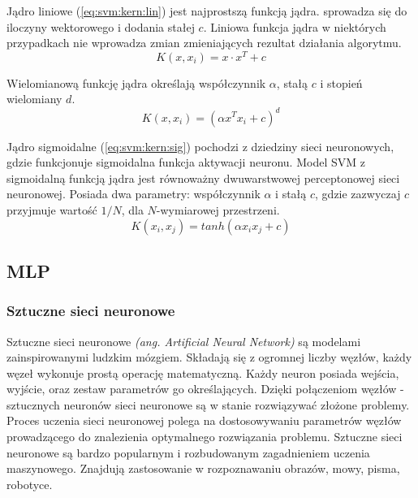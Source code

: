 \documentclass[a4paper,12pt,twoside,openany]{report}
\newcommand{\ang}[1]{\textit{(ang. #1)}}
\newcommand{\Eq}[1]{(\ref{#1})}
\begin{document}
Jądro liniowe \Eq{eq:svm:kern:lin} jest najprostszą funkcją jądra. 
sprowadza się do iloczyny wektorowego i dodania stałej $c$.
Liniowa funkcja jądra w niektórych przypadkach nie wprowadza zmian zmieniających rezultat działania algorytmu.
\begin{equation}
	\label{eq:svm:kern:lin}
	K(x, x_i) = x \cdot x ^ T + c
\end{equation}

Wielomianową funkcję jądra określają współczynnik $\alpha$, stałą $c$ i stopień wielomiany $d$.
\begin{equation}
	\label{eq:svm:kern:poly}
	K(x, x_i) = (\alpha x^T x_i + c)^d 
\end{equation}

Jądro sigmoidalne \Eq{eq:svm:kern:sig} pochodzi z dziedziny sieci neuronowych,
gdzie funkcjonuje sigmoidalna funkcja aktywacji neuronu. 
Model SVM z sigmoidalną funkcją jądra jest równoważny dwuwarstwowej perceptonowej sieci neuronowej.
Posiada dwa parametry: współczynnik $\alpha$ i stałą $c$, gdzie zazwyczaj $c$ przyjmuje wartość $1/N$,
dla $N$-wymiarowej przestrzeni.
\begin{equation}
	\label{eq:svm:kern:sig}
	K(x_i, x_j) = tanh( \alpha x_i  x_j + c)
\end{equation}
\subsection{MLP}
\subsubsection{Sztuczne sieci neuronowe}
Sztuczne sieci neuronowe \ang{Artificial Neural Network} są modelami zainspirowanymi ludzkim mózgiem.
Składają się z ogromnej liczby węzłów, każdy węzeł wykonuje prostą operację matematyczną.
Każdy neuron posiada wejścia, wyjście, oraz zestaw parametrów go określających. 
Dzięki połączeniom węzłów - sztucznych neuronów sieci neuronowe są w stanie rozwiązywać złożone problemy.
Proces uczenia sieci neuronowej polega na dostosowywaniu parametrów węzłów prowadzącego do znalezienia optymalnego rozwiązania problemu.
Sztuczne sieci neuronowe są bardzo popularnym i rozbudowanym zagadnieniem uczenia maszynowego.
Znajdują zastosowanie w rozpoznawaniu obrazów, mowy, pisma, robotyce. 
\end{document}
